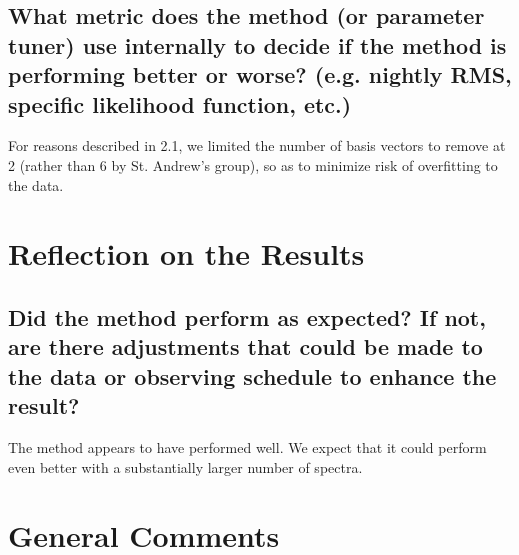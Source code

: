 \documentclass[12pt]{article}
\begin{document}

\subsection{What metric does the method (or parameter tuner) use internally to decide if the method is performing better or worse?  (e.g. nightly RMS, specific likelihood function, etc.)}

For reasons described in 2.1, we limited the number of basis vectors to remove at 2 (rather than 6 by St. Andrew's group), so as to minimize risk of overfitting to the data.



\section{Reflection on the Results}
\subsection{Did the method perform as expected?  If not, are there adjustments that could be made to the data or observing schedule to enhance the result?}

The method appears to have performed well.  We expect that it could perform even better with a substantially larger number of spectra.





\section{General Comments}
\end{document}
